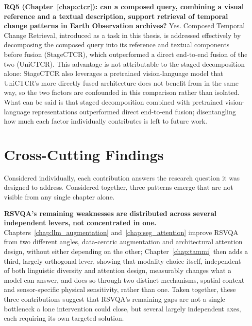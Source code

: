 \textbf{RQ5 (Chapter~\ref{chap:ctcr}): can a composed query, combining a visual reference and a textual description, support retrieval of temporal change patterns in Earth Observation archives?} Yes. Composed Temporal Change Retrieval, introduced as a task in this thesis, is addressed effectively by decomposing the composed query into its reference and textual components before fusion (StageCTCR), which outperformed a direct end-to-end fusion of the two (UniCTCR). This advantage is not attributable to the staged decomposition alone: StageCTCR also leverages a pretrained vision-language model that UniCTCR's more directly fused architecture does not benefit from in the same way, so the two factors are confounded in this comparison rather than isolated. What can be said is that staged decomposition combined with pretrained vision-language representations outperformed direct end-to-end fusion; disentangling how much each factor individually contributes is left to future work.

\section{Cross-Cutting Findings}
\label{sec:conclusion_crosscutting}

Considered individually, each contribution answers the research question it was designed to address. Considered together, three patterns emerge that are not visible from any single chapter alone.

\textbf{RSVQA's remaining weaknesses are distributed across several independent levers, not concentrated in one.} Chapters~\ref{chap:llm_augmentation} and~\ref{chap:seg_attention} improve RSVQA from two different angles, data-centric augmentation and architectural attention design, without either depending on the other; Chapter~\ref{chap:tammi} then adds a third, largely orthogonal lever, showing that modality choice itself, independent of both linguistic diversity and attention design, measurably changes what a model can answer, and does so through two distinct mechanisms, spatial context and sensor-specific physical sensitivity, rather than one. Taken together, these three contributions suggest that RSVQA's remaining gaps are not a single bottleneck a lone intervention could close, but several largely independent axes, each requiring its own targeted solution.

